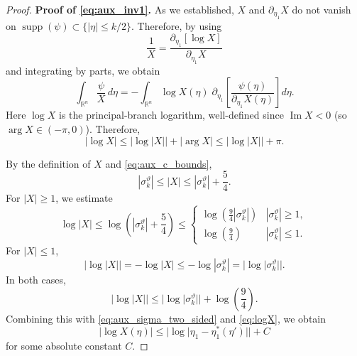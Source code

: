 \documentclass[10pt,a4paper]{amsart}
\begin{document}
\begin{proof}
\textbf{Proof of \eqref{eq:aux_inv1}.}
As we established, $X$ and $\partial_{\eta_1} X$ do not vanish on $\operatorname{supp} (\psi) \subset \{|\eta|\leq k/2\}$. Therefore, by using
\begin{equation*}
    \frac{1}{X} = \frac{\partial_{\eta_1}[\log X]}{\partial_{\eta_1} X}
\end{equation*}
and integrating by parts, we obtain
\begin{equation}\label{eq:aux_IBP}
  \int_{\mathbb{R}^n}\frac{\psi}{X}\,d\eta
  = -\int_{\mathbb{R}^n}\log X(\eta)\;\partial_{\eta_1}\!\left[
      \frac{\psi(\eta)}{\partial_{\eta_1}X(\eta)}
    \right]d\eta.
\end{equation}
Here $\log X$ is the principal-branch logarithm, well-defined since
$\operatorname{Im} X<0$ (so $\arg X\in(-\pi,0)$). Therefore,
\begin{equation}\label{eq:logX}
    |\log X| \leq |\log |X|| + |\arg X| \leq |\log |X|| + \pi.
\end{equation}

By the definition of $X$ and \eqref{eq:aux_c_bounds},
\begin{equation*}
    |\sigma_k^\vartheta| \leq |X| \leq |\sigma_k^\vartheta|  + \frac{5}{4}.
\end{equation*}
For $|X|\geq 1$, we estimate
\begin{equation*}
    \log |X| \leq \log \left(|\sigma_k^\vartheta|  + \frac{5}{4}\right) \leq 
    \begin{cases}
        \log\left(\frac{9}{4}|\sigma_k^\vartheta| \right) & |\sigma_k^\vartheta| \geq 1,\\
        \log\left(\frac{9}{4} \right) & |\sigma_k^\vartheta| \leq 1.\
    \end{cases}
\end{equation*}
For $|X|\leq 1$,
\begin{equation*}
    |\log |X|| = - \log |X|\leq - \log |\sigma_k^\vartheta| = |\log |\sigma_k^\vartheta||.
\end{equation*}
In both cases,
\begin{equation*}
    |\log |X|| \leq |\log |\sigma_k^\vartheta|| + \log\left(\frac{9}{4} \right).
\end{equation*}
Combining this with \eqref{eq:aux_sigma_two_sided} and \eqref{eq:logX}, we obtain
\begin{equation}\label{eq:aux_logX}
  |\log X(\eta)|\le|\log|\eta_1-\eta_1^*(\eta')||+C
\end{equation}
for some absolute constant $C$.


\end{proof}
\end{document}
